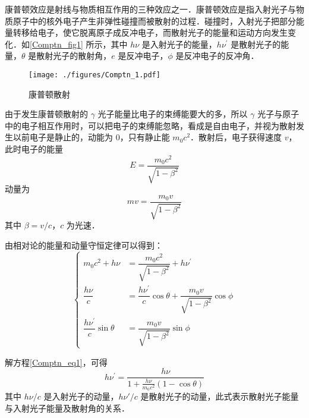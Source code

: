 
\begin{issues}
\issueMissDepend
\end{issues}

康普顿效应是射线与物质相互作用的三种效应之一．康普顿效应是指入射光子与物质原子中的核外电子产生非弹性碰撞而被散射的过程．碰撞时，入射光子把部分能量转移给电子，使它脱离原子成反冲电子，而散射光子的能量和运动方向发生变化．如\autoref{Comptn_fig1} 所示，其中 $h\nu$ 是入射光子的能量，$h\nu^\prime$ 是散射光子的能量，$\theta$ 是散射光子的散射角，$e$ 是反冲电子，$\phi$ 是反冲电子的反冲角．
\begin{figure}[ht]
\centering
\texttt{[image: ./figures/Comptn\_1.pdf]}
\caption{康普顿散射} \label{Comptn_fig1}
\end{figure}
由于发生康普顿散射的 $\gamma$ 光子能量比电子的束缚能要大的多，所以 $\gamma$ 光子与原子中的电子相互作用时，可以把电子的束缚能忽略，看成是自由电子，并视为散射发生以前电子是静止的，动能为 $0$，只有静止能 $m_0c^2$．散射后，电子获得速度 $v$，此时电子的能量
\begin{equation}
E=\frac{m_{0} c^{2}}{\sqrt{1-\beta^{2}}}
\end{equation}
动量为
\begin{equation}
m v=\frac{m_{0} v}{\sqrt{1-\beta^{2}}}
\end{equation}
其中 $\beta=v/c$，$c$ 为光速．

由相对论的能量和动量守恒定律可以得到：
\begin{equation} \label{Comptn_eq1}
\begin{cases}
m_{0} c^{2}+h \nu&=\dfrac{m_{0} c^{2}}{\sqrt{1-\beta^{2}}}+h \nu^{\prime} \\
\dfrac{h \nu}{c}&=\dfrac{h \nu^{\prime}}{c} \cos \theta+\dfrac{m_{0} v}{\sqrt{1-\beta^{2}}} \cos \phi \\
\dfrac{h \nu^{\prime}}{c} \sin \theta&=\dfrac{m_{0} v}{\sqrt{1-\beta^{2}}} \sin \phi
\end{cases}
\end{equation}

解方程\autoref{Comptn_eq1}，可得
\begin{equation}
h \nu^{\prime}=\frac{h \nu}{1+\frac{h \nu}{m_{0} c^{2}}(1-\cos \theta)}
\end{equation}
其中 $h\nu / c$ 是入射光子的动量，$h\nu' / c$ 是散射光子的动量，此式表示散射光子能量与入射光子能量及散射角的关系．